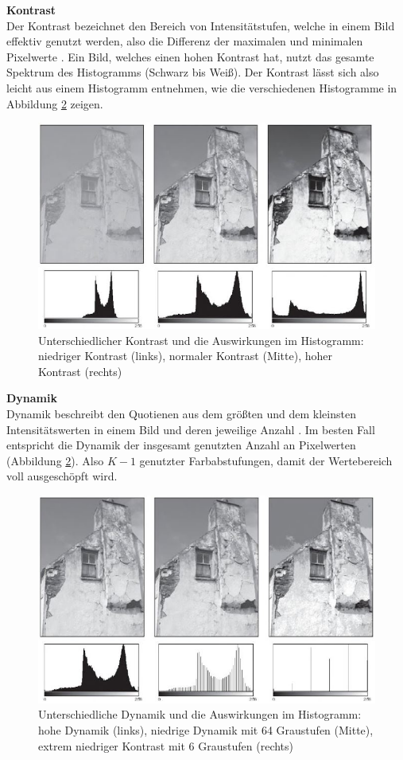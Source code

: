 \textbf{Kontrast}\label{s.kontrast}\\
Der Kontrast bezeichnet den Bereich von Intensitätstufen, welche in einem Bild effektiv genutzt werden, also die Differenz der maximalen und minimalen Pixelwerte \cite[44]{burger2009digitale}. Ein Bild, welches einen hohen Kontrast hat, nutzt das gesamte Spektrum des Histogramms (Schwarz bis Weiß). Der Kontrast lässt sich also leicht aus einem Histogramm entnehmen, wie die verschiedenen Histogramme in Abbildung \ref{img:dynamik} zeigen.
  \begin{figure}
    [h]
    \centering
    \includegraphics[scale=0.5]{Sources/kontrast.JPG}
    \caption{Unterschiedlicher Kontrast und die Auswirkungen im Histogramm: niedriger Kontrast (links), normaler Kontrast (Mitte), hoher Kontrast (rechts)\cite[45]{burger2009digitale}}
    \label{img:kontrast}
  \end{figure}
  \newpage
\textbf{Dynamik}\label{s.dynamik}\\
Dynamik beschreibt den Quotienen aus dem größten und dem kleinsten Intensitätswerten in einem Bild und deren jeweilige Anzahl \cite[44]{burger2009digitale}. Im besten Fall entspricht die Dynamik der insgesamt genutzten Anzahl an Pixelwerten (Abbildung \ref{img:dynamik}). Also $K-1$ genutzter Farbabstufungen, damit der Wertebereich voll ausgeschöpft wird.
 \begin{figure}
    [h]
    \centering
    \includegraphics[scale=0.5]{Sources/dynamik.JPG}
    \caption{Unterschiedliche Dynamik und die Auswirkungen im Histogramm: hohe Dynamik (links), niedrige Dynamik mit 64 Graustufen (Mitte), extrem niedriger Kontrast mit 6 Graustufen (rechts)\cite[45]{burger2009digitale}}
    \label{img:dynamik}
  \end{figure}\\
